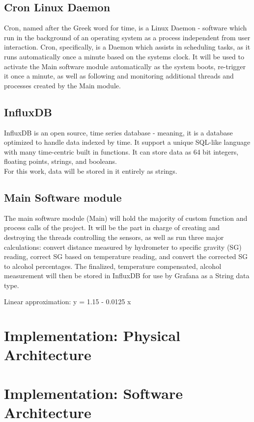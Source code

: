 \documentclass[twoside]{ctuthesis}
\theoremstyle{plain}
\theoremstyle{definition}
\theoremstyle{note}
\begin{document}
\subsection{Cron Linux Daemon}
Cron, named after the Greek word for time, is a Linux Daemon - software which run in the background of an operating system as a process independent from user interaction. Cron, specifically, is a Daemon which assists in scheduling tasks, as it runs automatically once a minute based on the systems clock. It will be used to activate the Main software module automatically as the system boots, re-trigger it once a minute, as well as following and monitoring additional threads and processes created by the Main module.\\

\subsection{InfluxDB}
InfluxDB is an open source, time series database - meaning, it is a database optimized to handle data indexed by time. It support a unique SQL-like language with many time-centric built in functions. It can store data as 64 bit integers, floating points, strings, and booleans.\\
For this work, data will be stored in it entirely as strings.

\subsection{Main Software module}
The main software module (Main) will hold the majority of custom function and process calls of the project. It will be the part in charge of creating and destroying the threads controlling the sensors, as well as run three major calculations: convert distance measured by hydrometer to specific gravity (SG) reading, correct SG based on temperature reading, and convert the corrected SG to alcohol percentages. The finalized, temperature compensated, alcohol measurement will then be stored in InfluxDB for use by Grafana as a String data type.



Linear approximation: y = 1.15 - 0.0125 x
\section{Implementation: Physical Architecture}





\section{Implementation: Software Architecture}
\end{document}
